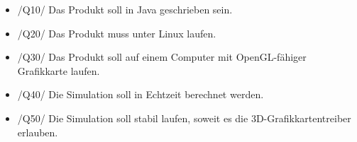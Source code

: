\begin{itemize}

\item  /Q10/ Das Produkt soll in Java geschrieben sein.
\item  /Q20/ Das Produkt muss unter Linux laufen.
\item  /Q30/ Das Produkt soll auf einem Computer mit OpenGL-fähiger Grafikkarte laufen.
\item  /Q40/ Die Simulation soll in Echtzeit berechnet werden.
\item  /Q50/ Die Simulation soll stabil laufen, soweit es die 3D-Grafikkartentreiber erlauben.

\end{itemize}
